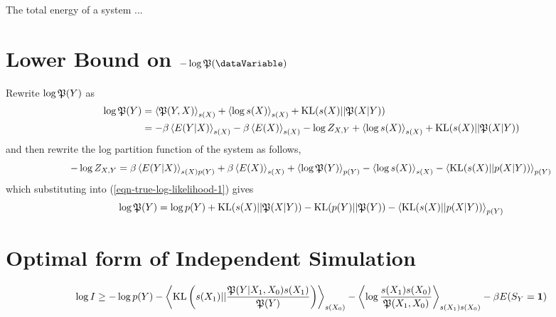 \documentclass[]{article}
\begin{document}
The total energy of a system ...

\section{Lower Bound on $-\log \trueProb(\dataVariable)$} \label{sec-upper-bound-log-prob}

Rewrite $\log \mathfrak{P}(Y)$ as
\begin{align}
    \log \mathfrak{P}(Y) & =
    \left\langle \mathfrak{P}(Y,
      X) \right\rangle_{s(X )} + \left\langle \log
      s(X) \right\rangle_{s(X)} +
    \text{KL}(s(X)||\mathfrak{P}(X|Y))
    \nonumber \\ & = -\beta\left\langle  E(Y |
      X) \right\rangle_{s(X)}
    -\beta\left\langle E(X) \right\rangle_{s(X)} -
    \log Z_{X,Y} + \left\langle \log
      s(X) \right\rangle_{s(X)} +
    \text{KL}(s(X)||\mathfrak{P}(X|Y)) \label{eqn-true-log-likelihood-1}
\end{align}
and then rewrite the log partition function of the system as follows,
\[
- \log Z_{X,Y} =
\beta\left\langle E(Y |
  X) \right\rangle_{s(X)p(Y)}
+ \beta\left\langle E(X) \right\rangle_{s(X )} +
\left\langle \log \mathfrak{P}(Y) \right\rangle_{p(Y)}
-\left\langle \log s(X) \right\rangle_{s(X)} -
\left\langle \text{KL}(s(X) ||
  p(X |
  Y)) \right\rangle_{p(Y)}
\]
which substituting into (\ref{eqn-true-log-likelihood-1}) gives
\[
\log \mathfrak{P}(Y) = \log p(Y) +
\text{KL}(s(X)||\mathfrak{P}(X|Y))
- \text{KL}(p(Y) || \mathfrak{P}(Y))
- \left\langle \text{KL}(s(X) ||
  p(X |
  Y)) \right\rangle_{p(Y)}
\]

\section{Optimal form of Independent Simulation} \label{sec-optimal-form-of-independent-simulation}


$$
\log I \geq -\log p(Y) - \left\langle \text{KL}\left(s({X_1}) || \frac{\mathfrak{P}(Y | {X_1},{X_0})s({X_1})}{\mathfrak{P}(Y)}\right) \right\rangle_{s({X_0})}  - \left\langle \log \frac{s({X_1})s({X_0})}{\mathfrak{P}({X_1},{X_0})} \right\rangle_{s({X_1})s({X_0})}  -\beta E(S_Y=\textbf{1})
$$
\end{document}
